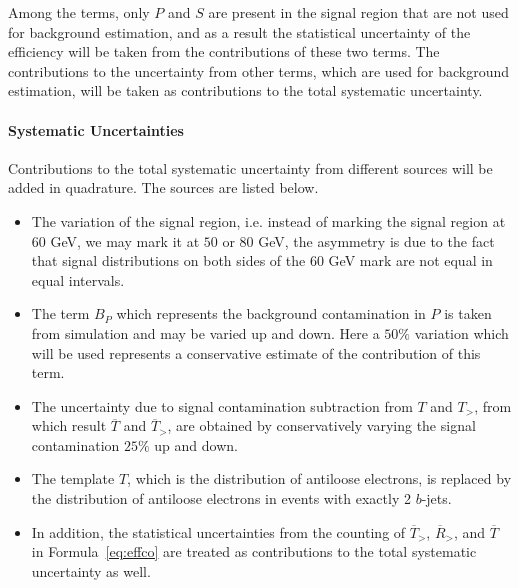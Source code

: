 Among the terms, only $P$ and $S$ are present in the signal region that are not
used for background estimation, and as a result the statistical uncertainty of
the efficiency will be taken from the contributions of these two terms. The
contributions to the uncertainty from other terms, which are used for
background estimation, will be taken as contributions to the total systematic
uncertainty.


\paragraph{Systematic Uncertainties} Contributions to the total systematic
uncertainty from different sources will be added in quadrature. The sources are
listed below.

\begin{itemize}

	\item The variation of the signal region, i.e. instead of marking the signal
	      region at $60$ GeV, we may mark it at $50$ or $80$ GeV, the asymmetry is due to
	      the fact that signal distributions on both sides of the $60$ GeV mark are not
	      equal in equal intervals.


	\item The term $B_P$ which represents the background contamination in $P$ is
	      taken from simulation and may be varied up and down. Here a $50\%$ variation
	      which will be used represents a conservative estimate of the contribution of
	      this term.


	\item The uncertainty due to signal contamination subtraction from $T$ and
	      $T_>$, from which result $\overline{T}$ and $\overline{T}_>$, are obtained
	      by conservatively varying the signal contamination $25\%$ up and down.

	\item The template $T$, which is the distribution of antiloose electrons,
	      is replaced by the distribution of antiloose electrons in events with exactly 2
	      $b$-jets.


	\item In addition, the statistical uncertainties from the counting of
	      $\overline{T}_>$, $\overline{R}_>$, and $\overline{T}$ in
	      Formula~\ref{eq:effco} are treated as contributions to the total systematic
	      uncertainty as well.


\end{itemize}


